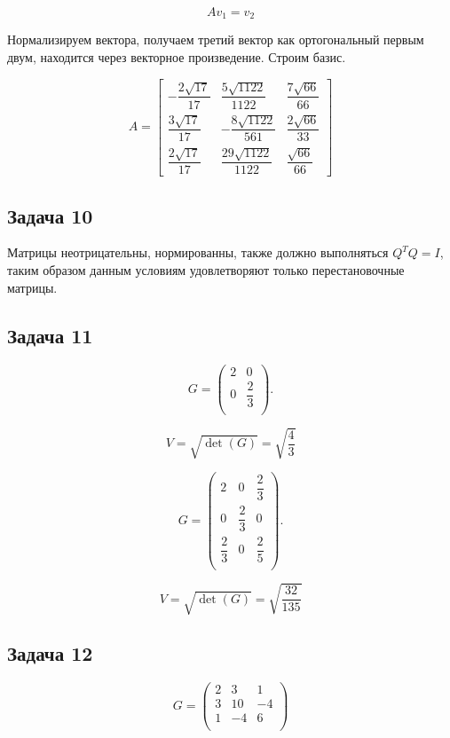 \documentclass[a4paper,12pt]{article}
\begin{document}
\[
Av_1 = v_2
\]

Нормализируем вектора, получаем третий вектор как ортогональный первым двум, находится через векторное произведение. Строим базис.

\[
A =
\begin{bmatrix}
-\dfrac{2\sqrt{17}}{17} & \dfrac{5\sqrt{1122}}{1122} & \dfrac{7\sqrt{66}}{66} \\
\dfrac{3\sqrt{17}}{17} & -\dfrac{8\sqrt{1122}}{561} & \dfrac{2\sqrt{66}}{33} \\
\dfrac{2\sqrt{17}}{17} & \dfrac{29\sqrt{1122}}{1122} & \dfrac{\sqrt{66}}{66}
\end{bmatrix}
\]

\subsection{Задача 10}

Матрицы неотрицательны, нормированны, также должно выполняться \( Q^T Q = I \), таким образом данным условиям удовлетворяют только перестановочные матрицы.

\subsection{Задача 11}

\[
G = \begin{pmatrix}
2 & 0 \\
0 & \dfrac{2}{3} \\
\end{pmatrix}.
\]

\[
V = \sqrt{\det(G)} = \sqrt{\dfrac{4}{3}}
\]

\[
G = \begin{pmatrix}
2 & 0 & \dfrac{2}{3} \\
0 & \dfrac{2}{3} & 0 \\
\dfrac{2}{3} & 0 & \dfrac{2}{5} \\
\end{pmatrix}.
\]

\[
V = \sqrt{\det(G)} = \sqrt{\dfrac{32}{135}}
\]

\subsection{Задача 12}

\[
G = \begin{pmatrix}
    2 & 3 & 1 \\
    3 & 10 & -4 \\
    1 & -4 & 6 \\
\end{pmatrix}
\]
\end{document}
